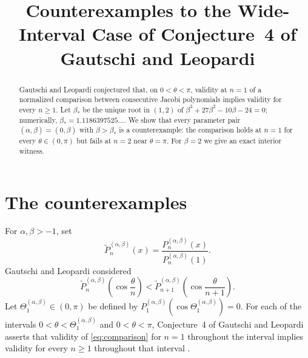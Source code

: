 \documentclass[11pt]{amsart}
\title[Counterexamples to Conjecture 4]
{Counterexamples to the Wide-Interval Case of Conjecture~4 of Gautschi and Leopardi}
\date{}
\theoremstyle{remark}
\begin{document}
\begin{abstract}
Gautschi and Leopardi conjectured that, on $0<\theta<\pi$,
validity at $n=1$ of a normalized comparison between consecutive
Jacobi polynomials implies validity for every $n\ge1$. Let
$\beta_*$ be the unique root in $(1,2)$ of
$\beta^3+27\beta^2-10\beta-24=0$; numerically,
$\beta_*=1.1186397525\ldots$. We show that every parameter pair
$(\alpha,\beta)=(0,\beta)$ with $\beta>\beta_*$ is a counterexample:
the comparison holds at $n=1$ for every $\theta\in(0,\pi)$ but fails
at $n=2$ near $\theta=\pi$. For $\beta=2$ we give an exact interior
witness.
\end{abstract}

\maketitle

\section{The counterexamples}

For $\alpha,\beta>-1$, set
\[
\widetilde P_n^{(\alpha,\beta)}(x)
=
\frac{P_n^{(\alpha,\beta)}(x)}{P_n^{(\alpha,\beta)}(1)}.
\]
Gautschi and Leopardi considered
\begin{equation}\label{eq:comparison}
\widetilde P_n^{(\alpha,\beta)}
 \!\left(\cos\frac{\theta}{n}\right)
<
\widetilde P_{n+1}^{(\alpha,\beta)}
 \!\left(\cos\frac{\theta}{n+1}\right).
\end{equation}
Let $\Theta_1^{(\alpha,\beta)}\in(0,\pi)$ be defined by
$P_1^{(\alpha,\beta)}(\cos\Theta_1^{(\alpha,\beta)})=0$. For each
of the intervals $0<\theta<\Theta_1^{(\alpha,\beta)}$ and
$0<\theta<\pi$, Conjecture~4 of Gautschi and Leopardi asserts that
validity of \eqref{eq:comparison} for $n=1$ throughout the interval
implies validity for every $n\ge1$ throughout that interval
\cite[Conjecture~4]{GautschiLeopardi}.
\end{document}
